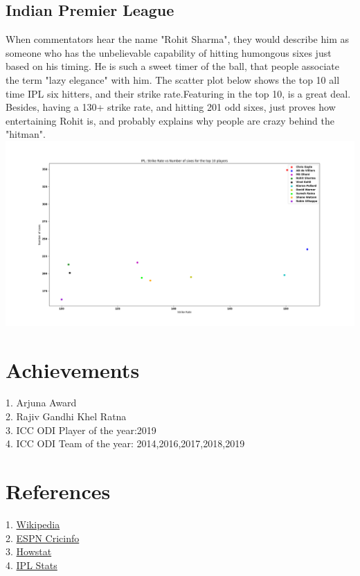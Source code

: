 \documentclass[twoside,10pt,a4paper]{article}
\numberwithin{equation}{section}
\numberwithin{figure}{section}
\begin{document}
\subsection{Indian Premier League}
When commentators hear the name "Rohit Sharma", they would describe him as someone who has the unbelievable capability of hitting humongous sixes just based on his timing. He is such a sweet timer of the ball, that people associate the term "lazy elegance" with him.
The scatter plot below shows the top 10 all time IPL six hitters, and their strike rate.Featuring in the top 10, is a great deal. Besides, having a 130+ strike rate, and hitting 201 odd sixes, just proves how entertaining Rohit is, and probably explains why people are crazy behind the "hitman". 
\includegraphics[scale=0.3]{ipl_.png}
\section{Achievements}
1. Arjuna Award\\
2. Rajiv Gandhi Khel Ratna\\
3. ICC ODI Player of the year:2019\\
4. ICC ODI Team of the year: 2014,2016,2017,2018,2019\\
\section{References}
\begin{flushleft}
        1. \href{https://en.wikipedia.org/wiki/Rohit_Sharma}{Wikipedia}\\
        2. \href{https://www.espncricinfo.com/india/content/player/34102.html}{ESPN Cricinfo}\\
        3. \href{http://howstat.com/cricket/Statistics/Players/PlayerOverviewSummary.asp?PlayerID=3474}{Howstat}\\
        4. \href{https://www.iplt20.com/stats/all-time/most-sixes}{IPL Stats}
\end{flushleft}
\end{document}

